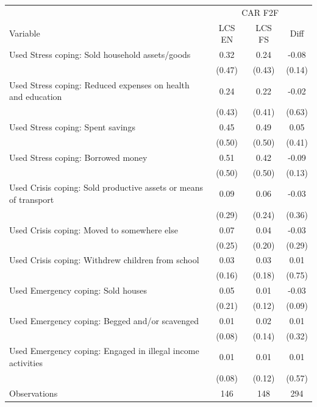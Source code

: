 \begin{tabular}{l*{3}c}
\hline\hline
 & \multicolumn{3}{c}{CAR F2F}\\ 
Variable & LCS EN & LCS FS & Diff \\
\hline
Used Stress coping: Sold household assets/goods&0.32&0.24&-0.08\\
&(0.47)&(0.43)&(0.14)\\
Used Stress coping: Reduced expenses on health and education&0.24&0.22&-0.02\\
&(0.43)&(0.41)&(0.63)\\
Used Stress coping: Spent savings&0.45&0.49&0.05\\
&(0.50)&(0.50)&(0.41)\\
Used Stress coping: Borrowed money&0.51&0.42&-0.09\\
&(0.50)&(0.50)&(0.13)\\
Used Crisis coping: Sold productive assets or means of transport&0.09&0.06&-0.03\\
&(0.29)&(0.24)&(0.36)\\
Used Crisis coping: Moved to somewhere else&0.07&0.04&-0.03\\
&(0.25)&(0.20)&(0.29)\\
Used Crisis coping: Withdrew children from school&0.03&0.03&0.01\\
&(0.16)&(0.18)&(0.75)\\
Used Emergency coping: Sold houses&0.05&0.01&-0.03\\
&(0.21)&(0.12)&(0.09)\\
Used Emergency coping: Begged and/or scavenged&0.01&0.02&0.01\\
&(0.08)&(0.14)&(0.32)\\
Used Emergency coping: Engaged in illegal income activities&0.01&0.01&0.01\\
&(0.08)&(0.12)&(0.57)\\
\hline
Observations & 146 & 148 & 294 \\
\hline\hline
\end{tabular}
